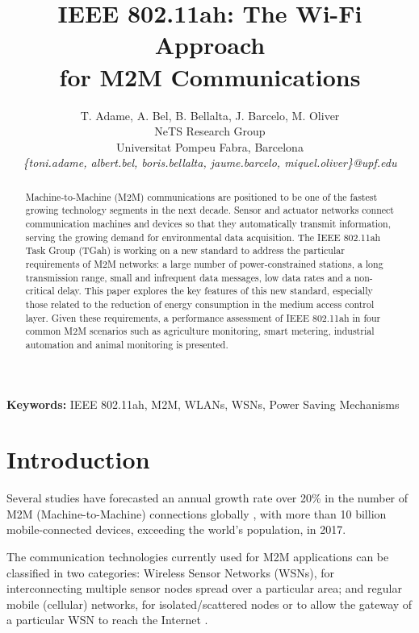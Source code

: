 \documentclass[]{article}
\begin{document}
\title{IEEE 802.11ah: The Wi-Fi Approach\\ for M2M Communications}
\author{T. Adame, A. Bel, B. Bellalta, J. Barcelo, M. Oliver\\NeTS Research Group \\Universitat Pompeu Fabra, Barcelona\\
	    \emph{\{toni.adame, albert.bel, boris.bellalta, jaume.barcelo, miquel.oliver\}@upf.edu}}

\maketitle

\begin{abstract}

Machine-to-Machine (M2M) communications are positioned to be one of the fastest growing technology segments in the next decade. Sensor and actuator networks connect communication machines and devices so that they automatically transmit information, serving the growing demand for environmental data acquisition. The IEEE 802.11ah Task Group (TGah) is working on a new standard to address the particular requirements of M2M networks: a large number of power-constrained stations, a long transmission range, small and infrequent data messages, low data rates and a non-critical delay. This paper explores the key features of this new standard, especially those related to the reduction of energy consumption in the medium access control layer. Given these requirements, a performance assessment of IEEE 802.11ah in four common M2M scenarios such as agriculture monitoring, smart metering, industrial automation and animal monitoring is presented.

\end{abstract}

{\bf Keywords:} IEEE 802.11ah, M2M, WLANs, WSNs, Power Saving Mechanisms

\doublespace

\section{Introduction}

Several studies have forecasted an annual growth rate over 20\% in the number of M2M (Machine-to-Machine) connections globally \cite{hatton}, with more than 10 billion mobile-connected devices, exceeding the world’s population, in 2017.

The communication technologies currently used for M2M applications can be classified in two categories:  Wireless Sensor Networks (WSNs), for interconnecting multiple sensor nodes spread over a particular area; and regular mobile (cellular) networks, for isolated/scattered nodes or to allow the gateway of a particular WSN to reach the Internet \cite{Babamir12}. 
\end{document}
